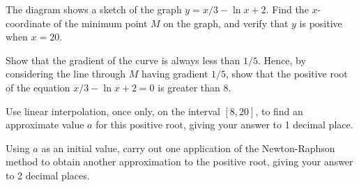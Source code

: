 \begin{problem}
    \begin{center}
    \end{center}

    The diagram shows a sketch of the graph $y = x/3 - \ln{x+2}$. Find the $x$-coordinate of the minimum point $M$ on the graph, and verify that $y$ is positive when $x = 20$.

    Show that the gradient of the curve is always less than $1/5$. Hence, by considering the line through $M$ having gradient $1/5$, show that the positive root of the equation $x/3 - \ln{x+2} = 0$ is greater than 8.

    Use linear interpolation, once only, on the interval $[8, 20]$, to find an approximate value $a$ for this positive root, giving your answer to 1 decimal place.

    Using $a$ as an initial value, carry out one application of the Newton-Raphson method to obtain another approximation to the positive root, giving your answer to 2 decimal places.
\end{problem}

